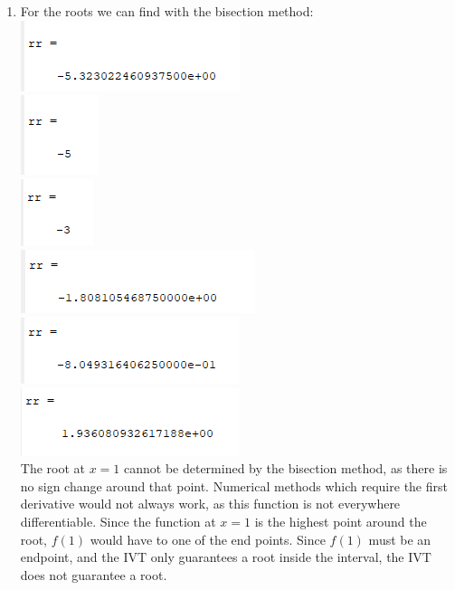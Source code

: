 \documentclass[12pt,letterpaper]{article}
\begin{document}
\begin{enumerate}
    \item For the roots we can find with the bisection method: \\
    \includegraphics{5a.png}\\
    \includegraphics{5b.png}\\
    \includegraphics{5c.png}\\
    \includegraphics{5d.png}\\
    \includegraphics{5e.png}\\
    \includegraphics{5f.png}\\
    The root at $x=1$ cannot be determined by the bisection method, as there is no 
    sign change around that point. Numerical methods which require the first derivative
    would not always work, as this function is not everywhere differentiable. Since
    the function at $x=1$ is the highest point around the root, $f(1)$ would have 
    to one of the end points. Since $f(1)$ must be an endpoint, and the IVT only
    guarantees a root inside the interval, the IVT does not guarantee a root. 

\end{enumerate}
\end{document}
